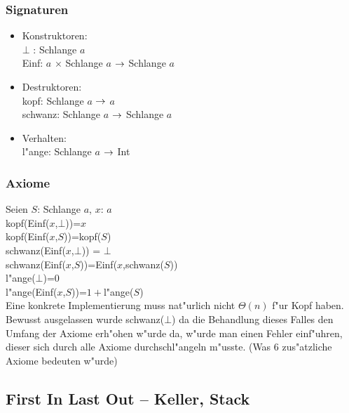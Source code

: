 \documentclass[a4paper,twoside,DIV15,BCOR12mm]{scrbook}
\begin{document}

\subsubsection*{Signaturen}
\begin{itemize}
	\item Konstruktoren:\\
$\bot$ : Schlange $a$\\
Einf: $a$ $\times$ Schlange $a$ $\rightarrow$ Schlange $a$

	\item Destruktoren:\\
kopf: Schlange $a$ $\rightarrow$ $a$\\
schwanz: Schlange $a$ $\rightarrow$ Schlange $a$
	
	\item Verhalten:\\
l"ange: Schlange $a$ $\rightarrow$ Int\\
\end{itemize}
\subsubsection*{Axiome}
Seien $S$: Schlange $a$, $x$: $a$\\
kopf(Einf($x$,$\bot$))=$x$\\
kopf(Einf($x$,$S$))=kopf($S$)\\
schwanz(Einf($x$,$\bot$)) = $\bot$\\
schwanz(Einf($x$,$S$))=Einf($x$,schwanz($S$))\\
l"ange($\bot$)=$0$\\
l"ange(Einf($x$,$S$))=$1+$l"ange($S$)\\

Eine konkrete Implementierung muss nat"urlich nicht $\Theta(n)$ f"ur Kopf haben.\\

Bewusst ausgelassen wurde schwanz($\bot$) da die Behandlung dieses Falles den Umfang der Axiome erh"ohen w"urde da, w"urde man einen Fehler einf"uhren, dieser sich durch alle Axiome durchschl"angeln m"usste. (Was 6 zus"atzliche Axiome bedeuten w"urde)

\subsection{First In Last Out -- Keller, Stack}
\end{document}
